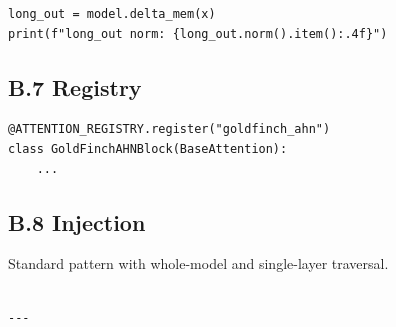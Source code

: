 \begin{lstlisting}
long_out = model.delta_mem(x)
print(f"long_out norm: {long_out.norm().item():.4f}")
\end{lstlisting}

\subsection{B.7 Registry}

\begin{lstlisting}
@ATTENTION_REGISTRY.register("goldfinch_ahn")
class GoldFinchAHNBlock(BaseAttention):
    ...
\end{lstlisting}

\subsection{B.8 Injection}

Standard pattern with whole-model and single-layer traversal.
\begin{lstlisting}

---
\end{lstlisting}